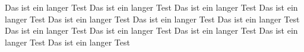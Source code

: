 Das ist ein langer Test
Das ist ein langer Test
Das ist ein langer Test
Das ist ein langer Test
Das ist ein langer Test
Das ist ein langer Test
Das ist ein langer Test
Das ist ein langer Test
Das ist ein langer Test
Das ist ein langer Test
Das ist ein langer Test
Das ist ein langer Test
